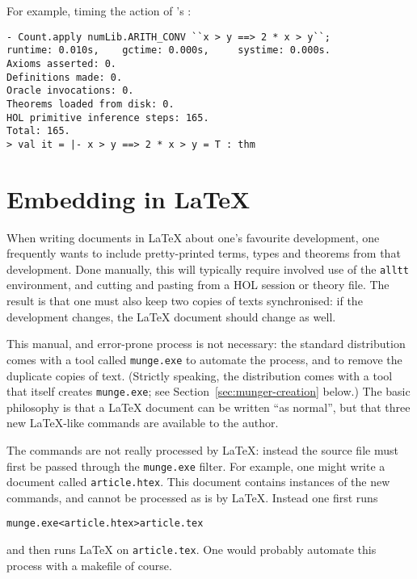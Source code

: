 For example, timing the action of 's :

\setcounter{sessioncount}{1}
\begin{session}
\begin{verbatim}
- Count.apply numLib.ARITH_CONV ``x > y ==> 2 * x > y``;
runtime: 0.010s,    gctime: 0.000s,     systime: 0.000s.
Axioms asserted: 0.
Definitions made: 0.
Oracle invocations: 0.
Theorems loaded from disk: 0.
HOL primitive inference steps: 165.
Total: 165.
> val it = |- x > y ==> 2 * x > y = T : thm
\end{verbatim}
\end{session}



\section{Embedding \HOL{} in \LaTeX{}}

%
When writing documents in \LaTeX{} about one's favourite \HOL{} development, one frequently wants to include pretty-printed terms, types and theorems from that development.
%
Done manually, this will typically require involved use of the \texttt{alltt} environment, and cutting and pasting from a HOL session or theory file.
%
The result is that one must also keep two copies of \HOL{} texts synchronised: if the \HOL{} development changes, the \LaTeX{} document should change as well.

\newcommand{\munge}{\texttt{munge.exe}}
%
This manual, and error-prone process is not necessary: the standard \HOL{} distribution comes with a tool called \munge{} to automate the process, and to remove the duplicate copies of \HOL{} text.
%
(Strictly speaking, the distribution comes with a tool that itself creates \munge{}; see Section~\ref{sec:munger-creation} below.)
%
The basic philosophy is that a \LaTeX{} document can be written ``as normal'', but that three new \LaTeX{}-like commands are available to the author.

The commands are not really processed by \LaTeX{}: instead the source file must first be passed through the \munge{} filter.
%
For example, one might write a document called \texttt{article.htex}.
%
This document contains instances of the new commands, and cannot be processed as is by \LaTeX{}.
%
Instead one first runs
\begin{alltt}
   \munge < article.htex > article.tex
\end{alltt}
and then runs \LaTeX{} on \texttt{article.tex}.
%
One would probably automate this process with a makefile of course.

